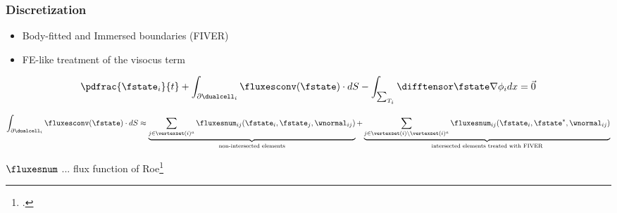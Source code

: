 
\begin{frame}
\frametitle{Discretization}
\begin{itemize}
 \item Body-fitted and Immersed boundaries (FIVER)
 \item FE-like treatment of the visocus term
\end{itemize}

\begin{align*}
\pdfrac{\fstate_i}{t} +
\int_{\partial\dualcell_i} \fluxesconv(\fstate)\cdot dS -
\int_{\sum_{T_i}} \difftensor \fstate \nabla \phi_i dx =
\vec{0}
\end{align*}


\begin{align*}
\int_{\partial\dualcell_i} \fluxesconv(\fstate)\cdot dS \approx
\underbrace{\sum_{j \in \vertexset(i)^a} \fluxesnum_{ij}(\fstate_{i},\fstate_{j},\wnormal_{ij})}_{\text{non-intersected elements}} +
\underbrace{\sum_{j \in \vertexset(i)\setminus\vertexset(i)^a} \fluxesnum_{ij}(\fstate_{i},\fstate^{*},\wnormal_{ij})}_{\text{intersected elements treated with FIVER}}
\end{align*}

$\fluxesnum$ ... flux function of Roe\footcite{Roe1981}

\end{frame}






